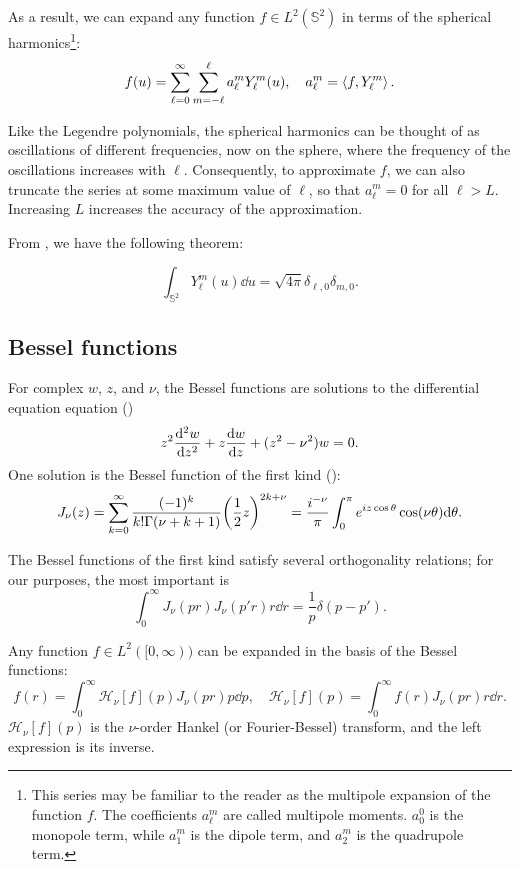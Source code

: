 \documentclass[../../main.tex]{subfiles}
\begin{document}
\begin{refsection}
	As a result, we can expand any function $f \in L^2(\mathbb{S}^2)$ in terms of the spherical harmonics\footnote{This series may be familiar to the reader as the multipole expansion of the function $f$.
		The coefficients $a_{\ell}^m$ are called multipole moments.
		$a_0^0$ is the monopole term, while $a_1^m$ is the dipole term, and $a_2^m$ is the quadrupole term.}:
	$$f(u) = \sum_{\ell=0}^\infty \sum_{m=-\ell}^\ell a_\ell^m Y_\ell^m(u), \quad a_\ell^m = \left\langle f, Y_\ell^m \right\rangle.$$

	Like the Legendre polynomials, the spherical harmonics can be thought of as oscillations of different frequencies, now on the sphere, where the frequency of the oscillations increases with $\ell$.
	Consequently, to approximate $f$, we can also truncate the series at some maximum value of $\ell$, so that $a_{\ell}^m = 0$ for all $\ell > L$.
	Increasing $L$ increases the accuracy of the approximation.

	From \cite[Eq. 5.9.1]{varshalovichQuantumTheoryAngular1988}, we have the following theorem:
	\begin{theorem}\label{sph-harm-norm}
		$$\int_{\mathbb{S}^2} Y_{\ell}^m(u) \dd{u} = \sqrt{4 \pi} \delta_{\ell,0} \delta_{m,0}.$$
	\end{theorem}

	\clearpage %
	\subsection{Bessel functions}

	For complex $w$, $z$, and $\nu$, the Bessel functions are solutions to the differential equation equation (\cite[Eq. 10.2.1]{NIST:DLMF})
	$$z^2 \dv[2]{w}{z} + z \dv{w}{z} + (z^2 - \nu^2) w = 0.$$
	One solution is the Bessel function of the first kind (\cite[Eqs. 10.2.2 and 10.9.2]{NIST:DLMF}):
	$$J_\nu(z) = \sum_{k=0}^\infty \frac{(-1)^k}{k! \Gamma(\nu + k + 1)} \qty(\frac{1}{2} z)^{2k + \nu} = \frac{i^{-\nu}}{\pi} \int_0^\pi e^{i z \cos\theta} \cos(\nu \theta) \dd\theta.$$

	The Bessel functions of the first kind satisfy several orthogonality relations; for our purposes, the most important is
	$$\int_{0}^\infty J_\nu(p r) J_\nu(p' r) r \dd r = \frac{1}{p} \delta(p - p').$$

	Any function $f \in L^2([0, \infty))$ can be expanded in the basis of the Bessel functions:
	$$f(r) = \int_0^\infty \mathcal{H}_\nu[f](p) J_\nu(p r) p \dd p, \quad \mathcal{H}_\nu[f](p) = \int_0^\infty f(r) J_\nu(p r) r \dd r.$$
	$\mathcal{H}_\nu[f](p)$ is the $\nu$-order Hankel (or Fourier-Bessel) transform, and the left expression is its inverse.


\end{refsection}
\end{document}
